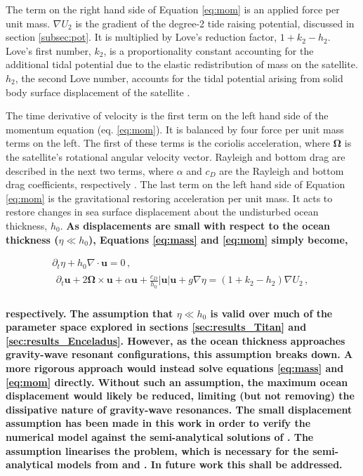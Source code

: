 The term on the right hand side of Equation \ref{eq:mom} is an applied force per unit mass. $\nabla U_2$ is the gradient of the degree-2 tide raising potential, discussed in section \ref{subsec:pot}. It is multiplied by Love's reduction factor, $1 + k_2 - h_2$. Love's first number, $k_2$, is a proportionality constant accounting for the additional tidal potential due to the elastic redistribution of mass on the satellite. $h_2$, the second Love number, accounts for the tidal potential arising from solid body surface displacement of the satellite \citep{love1911some}.

The time derivative of velocity is the first term on the left hand side of the momentum equation (eq. \ref{eq:mom}). It is balanced by four force per unit mass terms on the left. The first of these terms is the coriolis acceleration, where $\bm{\Omega}$ is the satellite's rotational angular velocity vector. Rayleigh and bottom drag are described in the next two terms, where $\alpha$ and $c_D$ are the Rayleigh and bottom drag coefficients, respectively \citep{sears1995tidal,chen2013tidal}. The last term on the left hand side of Equation \ref{eq:mom} is the gravitational restoring acceleration per unit mass. It acts to restore changes in sea surface displacement about the undisturbed ocean thickness, $h_0$. \textbf{As displacements are small with respect to the ocean thickness ($\eta \ll h_0$),  Equations \ref{eq:mass} and \ref{eq:mom} simply become,  }

\vspace{-0.5cm}
\begin{gather}
\partial_t \eta + h_0 \nabla \cdot \bm{u} = 0\, , \label{eq:mass_lin}\\
\begin{aligned} 
\partial_t \bm{u} + 2 \bm{\Omega} \times \bm{u} + \alpha\bm{u} + \frac{c_D}{h_0} \left|\bm{u}\right| \bm{u}  + g \nabla \eta = (1 + k_2 - h_2) \nabla U_2 \, , \label{eq:mom_lin}\\
\end{aligned} 
\end{gather}

\noindent \textbf{respectively.} \textbf{The assumption that $\eta \ll h_0$ is valid over much of the parameter space explored in sections \ref{sec:results_Titan} and \ref{sec:results_Enceladus}. However, as the ocean thickness approaches gravity-wave resonant configurations, this assumption breaks down. A more rigorous approach would instead solve equations \ref{eq:mass} and \ref{eq:mom} directly. Without such an assumption, the maximum ocean displacement would likely be reduced, limiting (but not removing) the dissipative nature of gravity-wave resonances. The small displacement assumption has been made in this work in order to verify the numerical model against the semi-analytical solutions of \citet{matsuyama2014tidal}. The assumption linearises the problem, which is necessary for the semi-analytical models from \citet{tyler2011tidal} and \citet{matsuyama2014tidal}. In future work this shall be addressed.}      

